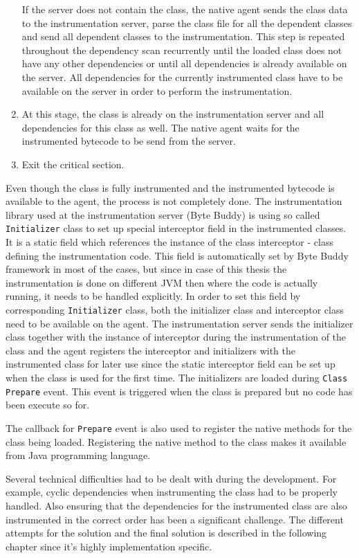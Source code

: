 \begin{enumerate}
	If the server does not contain the class, the native agent sends the class data to the instrumentation server, parse the class file for all the dependent classes and send all dependent classes to the instrumentation. This step is repeated throughout the dependency scan recurrently until the loaded class does not have any other dependencies or until all dependencies is already available on the server. All dependencies for the currently instrumented class have to be available on the server in order to perform the instrumentation.

	\item At this stage, the class is already on the instrumentation server and all dependencies for this class as well. The native agent waits for the instrumented bytecode to be send from the server. 
	\item Exit the critical section.
\end{enumerate}	
Even though the class is fully instrumented and the instrumented bytecode is available to the agent, the process is not completely done. The instrumentation library used at the instrumentation server (Byte Buddy) is using so called \texttt{Initializer} class to set up special interceptor field in the instrumented classes. It is a static field which references the instance of the class interceptor - class defining the instrumentation code. This field is automatically set by Byte Buddy framework in most of the cases, but since in case of this thesis the instrumentation is done on different JVM then where the code is actually running, it needs to be handled explicitly. In order to set this field by corresponding \texttt{Initializer} class, both the initializer class and interceptor class need to be available on the agent. The instrumentation server sends the initializer class together with the instance of interceptor during the instrumentation of the class and the agent registers the interceptor and initializers with the instrumented class for later use since the static interceptor field can be set up when the class is used for the first time. The initializers are loaded during  \texttt{Class Prepare} event. This event is triggered when the class is prepared but no code has been execute so for. 

The callback for \texttt{Prepare} event is also used to register the native methods for the class being loaded. Registering the native method to the class makes it available from Java programming language.

Several technical difficulties had to be dealt with during the development. For example,  cyclic dependencies when instrumenting the class had to be properly handled. Also ensuring that the dependencies for the instrumented class are also instrumented in the correct order has been a significant challenge. The different attempts for the solution and the final solution is described in the following chapter since it's highly implementation specific.
